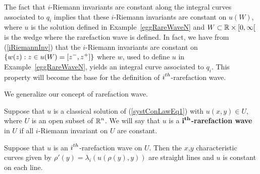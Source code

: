 \begin{egg}
The fact that $i$-Riemann invariants are constant along the integral
curves associated to $q_i$ implies that these $i$-Riemann invariants
are constant on $u(W)$, where $u$ is the solution defined in
Example~\ref{eggRareWaveN} and $W \subset \mathbb{R}\times [0,\infty[$ is the
wedge where the rarefaction wave is defined.
In fact, we have from (\ref{iRiemannInv}) that the $i$-Riemann invariants are
constant on $\displaystyle \{ w(z) : z \in u(W) = [z^-,z^+]\}$ where
$w$, used to define $u$ in Example~\ref{eggRareWaveN}, yields an integral
curve associated to $q_i$.
This property will become the base for the definition of 
$\displaystyle i^{th}$-rarefaction wave.
\end{egg}

We generalize our concept of rarefaction wave.

\begin{defn}
Suppose that $u$ is a classical solution of (\ref{systConLawEq1}) with
$u(x,y) \in U$, where $U$ is an open subset of $\displaystyle \mathbb{R}^n$.
We will say that $u$ is a
{\bfseries $\displaystyle \mathbf{i^{th}}$-rarefaction
wave}
in $U$ if all $i$-Riemann invariant on $U$ are constant.
\end{defn}

\begin{prop}
Suppose that $u$ is an $\displaystyle i^{th}$-rarefaction wave on $U$.
Then the $x$,$y$ characteristic curves given by
$\rho'(y) = \lambda_i(u(\rho(y),y))$  
are straight lines and $u$ is constant on each line.
\end{prop}

